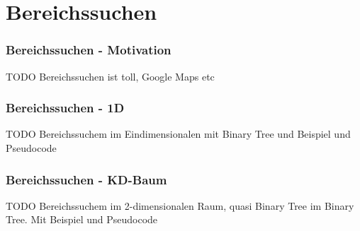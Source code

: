 \section{Bereichssuchen}
\begin{frame}
	\frametitle{Bereichssuchen - Motivation}
	TODO Bereichssuchen ist toll, Google Maps etc
\end{frame}

\begin{frame}
	\frametitle{Bereichssuchen - 1D}
	TODO Bereichssuchem im Eindimensionalen mit Binary Tree und Beispiel und Pseudocode
\end{frame}

\begin{frame}
	\frametitle{Bereichssuchen - KD-Baum}
	TODO Bereichssuchem im 2-dimensionalen Raum, quasi Binary Tree im Binary Tree. Mit Beispiel und Pseudocode
\end{frame}
